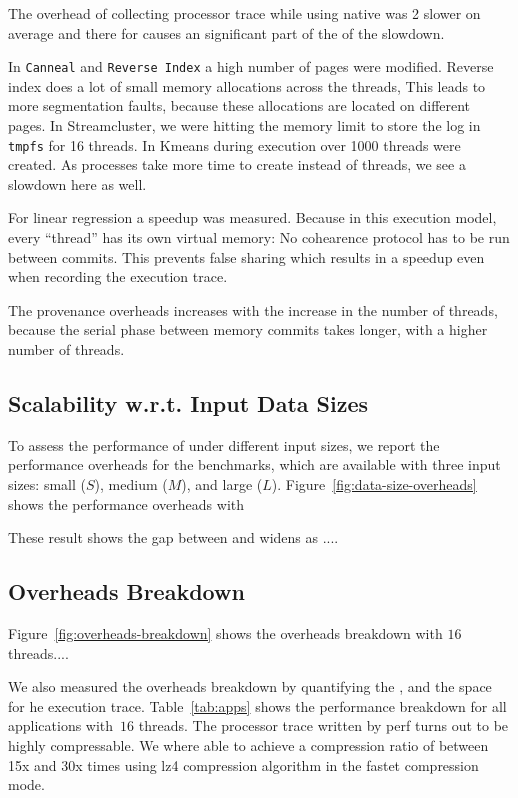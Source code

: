 The overhead of collecting processor trace while using native
\pthreads was 2 slower on average and there for causes an
significant part of the of the slowdown.

In {\tt Canneal} and {\tt Reverse Index} a high number of pages were modified.
Reverse index does a lot of small memory allocations across the threads, This
leads to more segmentation faults, because these allocations are located on
different pages. In Streamcluster, we were hitting the memory limit to store the
log in {\tt tmpfs} for 16 threads. In Kmeans during execution over 1000 threads
were created. As processes take more time to create instead of threads, we see
a slowdown here as well.

For linear regression a speedup was measured. Because in this execution model,
every “thread” has its own virtual memory: No cohearence protocol has to be run
between commits. This prevents false sharing which results in a speedup even
when recording the execution trace.

The provenance overheads increases with the increase in the number of
threads, because the serial phase between memory commits takes longer,
with a higher number of threads.



\subsection{Scalability w.r.t. Input Data Sizes}
\label{subsec:data-sizes-overheads}

To assess the performance of \projecttitle under different input sizes, we report the performance overheads for the benchmarks, which are
available with three input sizes: small ($S$), medium ($M$), and large ($L$). Figure~\ref{fig:data-size-overheads} shows the performance overheads with

These result shows the
gap between \pthreads and \projecttitle widens as ....





\subsection{Overheads Breakdown}
\label{subsec:overheads-breakdown}

Figure~\ref{fig:overheads-breakdown} shows the overheads breakdown with $16$ threads....





We also measured the overheads breakdown by
quantifying the , and the space for he execution trace. Table~\ref{tab:apps} shows the performance breakdown for all applications  with~$16$ threads.
The processor trace written by perf turns out to be highly compressable. We
where able to achieve a compression ratio of between 15x and 30x times using lz4
compression algorithm in the fastet compression mode.


